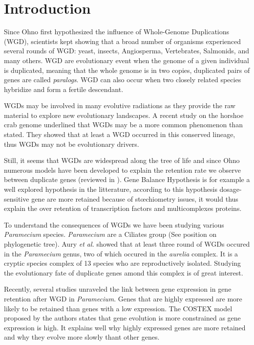\section*{Introduction}

Since Ohno first hypothesized the influence of Whole-Genome Duplications (WGD), scientists kept showing that a broad number of organisms experienced several rounds of WGD: yeast, insects, Angiosperma, Vertebrates, Salmonids, and many others. WGD are evolutionary event when the genome of a given individual is duplicated, meaning that the whole genome is in two copies, duplicated pairs of genes are called \textit{paralogs}. WGD can also occur when two closely related species hybridize and form a fertile descendant.

WGDs may be involved in many evolutive radiations as they provide the raw material to explore new evolutionary landscapes. A recent study on the horshoe crab genome underlined that WGDs may be a more common phenomenon than stated. They showed that at least a WGD occurred in this conserved lineage, thus WGDs may not be evolutionary drivers.

Still, it seems that WGDs are widespread along the tree of life and since Ohno numerous models have been developed to explain the retention rate we observe between duplicate genes (reviewed in ). Gene Balance Hypothesis is for example a well explored hypothesis in the litterature, according to this hypothesis dosage-sensitive gene are more retained because of stœchiometry issues, it would thus explain the over retention of transcription factors and multicomplexes proteins.

To understand the consequences of WGDs we have been studying various \textit{Paramecium} species. \textit{Paramecium} are a Ciliates group (See position on phylogenetic tree). Aury \textit{et al.} showed that at least three round of WGDs occured in the \textit{Paramecium} genus, two of which occured in the \textit{aurelia} complex. It is a cryptic species complex of 13 species who are reproductively isolated. Studying the evolutionary fate of duplicate genes amond this complex is of great interest.

Recently, several studies unraveled the link between gene expression in gene retention after WGD in \textit{Paramecium}. Genes that are highly expressed are more likely to be retained than genes with a low expression. The COSTEX model proposed by the authors states that gene evolution is more constrained as gene expression is high. It explains well why highly expressed genes are more retained and why they evolve more slowly thant other genes.

